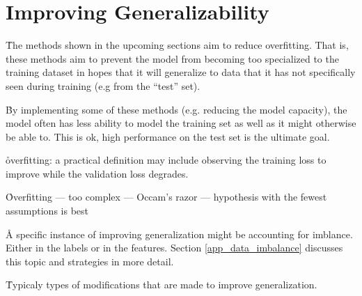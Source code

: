 \chapter{Improving Generalizability}

\r{The methods shown in the upcoming sections aim to reduce overfitting. That is, these methods aim to prevent the model from becoming too specialized to the training dataset in hopes that it will generalize to data that it has not specifically seen during training (e.g from the ``test'' set).}

\r{By implementing some of these methods (e.g. reducing the model capacity), the model often has less ability to model the training set as well as it might otherwise be able to. This is ok, high performance on the test set is the ultimate goal.}


\r{overfitting: a practical definition may include observing the training loss to improve while the validation loss degrades. }

\r{Overfitting --- too complex --- Occam's razor --- hypothesis with the fewest assumptions is best}

\r{A specific instance of improving generalization might be accounting for imblance. Either in the labels or in the features.  Section \ref{app_data_imbalance} discusses this topic and strategies in more detail.}

\r{Typicaly types of modifications that are made to improve generalization.}

